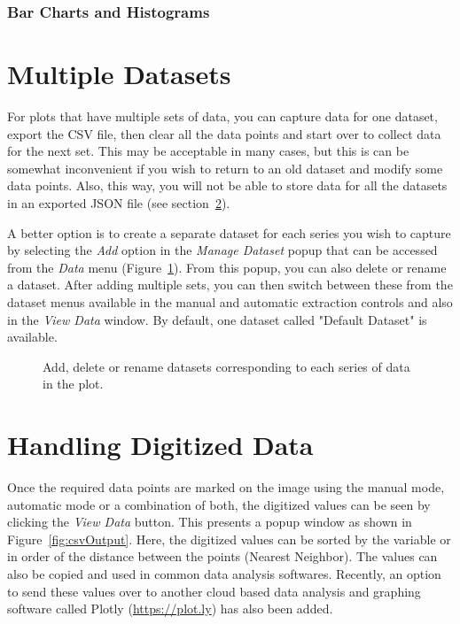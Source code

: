 \documentclass[letterpaper, 11pt]{article}
\begin{document}
\subsubsection{Bar Charts and Histograms}

\section{Multiple Datasets}
\label{sec:multipleDatasets}
For plots that have multiple sets of data, you can capture data for one dataset, export the CSV file, then clear all the data points and start over to collect data for the next set. This may be acceptable in many cases, but this is can be somewhat inconvenient if you wish to return to an old dataset and modify some data points. Also, this way, you will not be able to store data for all the datasets in an exported JSON file (see section~\ref{sec:csvData}). 

A better option is to create a separate dataset for each series you wish to capture by selecting the \emph{Add} option in the \emph{Manage Dataset} popup that can be accessed from the \emph{Data} menu (Figure~\ref{fig:manageDatasets}). From this popup, you can also delete or rename a dataset. After adding multiple sets, you can then switch between these from the dataset menus available in the manual and automatic extraction controls and also in the \emph{View Data} window. By default, one dataset called "Default Dataset" is available.

\begin{figure}[h]
\begin{center}
\caption{Add, delete or rename datasets corresponding to each series of data in the plot.}
\label{fig:manageDatasets}
\end{center}
\end{figure}

 
\section{Handling Digitized Data}
\label{sec:csvData}
Once the required data points are marked on the image using the manual mode, automatic mode or a combination of both, the digitized values can be seen by clicking the \emph{View Data} button. This presents a popup window as shown in Figure~\ref{fig:csvOutput}. Here, the digitized values can be sorted by the variable or in order of the distance between the points (Nearest Neighbor). The values can also be copied and used in common data analysis softwares. Recently, an option to send these values over to another cloud based data analysis and graphing software called Plotly (\url{https://plot.ly}) has also been added.
 
\end{document}
